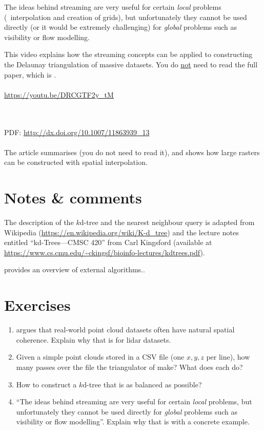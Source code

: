 The ideas behind streaming are very useful for certain \emph{local} problems (\eg\ interpolation and creation of grids), but unfortunately they cannot be used directly (or it would be extremely challenging) for \emph{global} problems such as visibility or flow modelling.

\begin{kaobox}[frametitle=\faExternalLink\ To read or to watch.]
  This video explains how the streaming concepts can be applied to constructing the Delaunay triangulation of massive datasets.
  You do \underline{not} need to read the full paper, which is \citet{Isenburg06}.
  \\ \\
  \url{https://youtu.be/DRCGTF2y_tM}
\end{kaobox}

\begin{kaobox}[frametitle=\faExternalLink\ To read or to watch.]
  \\ \\
  PDF: \url{http://dx.doi.org/10.1007/11863939_13}
  \\ \\
  The article summarises \citet{Isenburg06} (you do not need to read it), and shows how large rasters can be constructed with spatial interpolation.
\end{kaobox}


%
\section{Notes \& comments}

The description of the $k$d-tree and the nearest neighbour query is adapted from Wikipedia (\url{https://en.wikipedia.org/wiki/K-d_tree}) and the lecture notes entitled ``kd-Trees---CMSC 420'' from Carl Kingsford (available at \url{https://www.cs.cmu.edu/~ckingsf/bioinfo-lectures/kdtrees.pdf}).

\citet{Vitter01} provides an overview of external algorithms..


%
\section{Exercises}

\begin{enumerate}
  \item \citet{Isenburg06-1} argues that real-world point cloud datasets often have natural spatial coherence. Explain why that is for lidar datasets.
  \item Given a simple point clouds stored in a CSV file (one $x,y,z$ per line), how many passes over the file the triangulator of \citet{Isenburg06-1} make? What does each do?
  \item How to construct a $k$d-tree that is as balanced as possible?
  \item ``The ideas behind streaming are very useful for certain \emph{local} problems, but unfortunately they cannot be used directly for \emph{global} problems such as visibility or flow modelling''. Explain why that is with a concrete example.
\end{enumerate}
